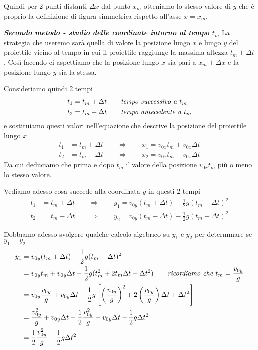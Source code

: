 \documentclass{article}
\begin{document}
Quindi per 2 punti distanti $\Delta x$ dal punto $x_m$ otteniamo lo stesso valore di $y$ che è proprio la definizione di figura simmetrica rispetto all'asse $x=x_m$.

\textbf{\textit{Secondo metodo - studio delle coordinate intorno al tempo $t_m$}}
\newline
La strategia che useremo sarà quella di valore la posizione lungo $x$ e lungo $y$ del proiettile vicino al tempo in cui il proiettile raggiunge la massima altezza $t_m \pm \Delta t$. Così facendo ci aspettiamo che la posizione lungo $x$ sia pari a $x_m \pm \Delta x$ e la posizione lungo $y$ sia la stessa.

Consideriamo quindi 2 tempi
\begin{align}
  t_1 &= t_m + \Delta t \qquad \text{\textit{tempo successivo a $t_m$}} \\
  t_2 &= t_m - \Delta t \qquad \text{\textit{tempo antecedente a $t_m$}}
\end{align}
e sostituiamo questi valori nell'equazione che descrive la posizione del proiettile lungo $x$
\begin{align}
  t_1 &= t_m + \Delta t \qquad \Rightarrow \qquad x_1 = v_{0x} t_m + v_{0x} \Delta t\\
  t_2 &= t_m - \Delta t \qquad \Rightarrow \qquad x_2 = v_{0x} t_m - v_{0x} \Delta t
\end{align}
Da cui deduciamo che prima e dopo $t_m$ il valore della posizione $v_{0x}t_m$ più o meno lo stesso valore.

Vediamo adesso cosa succede alla coordinata $y$ in questi 2 tempi
\begin{align}
  t_1 &= t_m + \Delta t \qquad \Rightarrow \qquad y_1 = v_{0y} (t_m + \Delta t) - \frac{1}{2}g(t_m + \Delta t)^2 \\
  t_2 &= t_m - \Delta t \qquad \Rightarrow \qquad y_2 = v_{0y} (t_m - \Delta t) - \frac{1}{2}g(t_m - \Delta t)^2
\end{align}

Dobbiamo adesso svolgere qualche calcolo algebrico su $y_1$ e $y_2$ per determinare se $y_1 = y_2$
\begin{align}
  y_1 &= v_{0y} (t_m + \Delta t) - \frac{1}{2}g(t_m + \Delta t)^2 \\
      &= v_{0y} t_m + v_{0y} \Delta t - \frac{1}{2}g (t_m^2 + 2 t_m \Delta t + \Delta t^2) \qquad \text{\textit{ricordiamo che $t_m = \frac{v_{0y}}{g}$}} \\
      &= v_{0y} \frac{v_{0y}}{g} + v_{0y} \Delta t - \frac{1}{2}g \left[\left(\frac{v_{0y}}{g}\right)^2 + 2 \left(\frac{v_{0y}}{g}\right) \Delta t + \Delta t^2\right] \\
      &= \frac{v_{0y}^2}{g} + v_{0y} \Delta t - \frac{1}{2} \frac{v_{0y}^2}{g} - v_{0y} \Delta t - \frac{1}{2}g \Delta t ^2 \\
      &= \frac{1}{2} \frac{v_{0y}^2}{g} - \frac{1}{2}g \Delta t ^2
\end{align}
\end{document}
